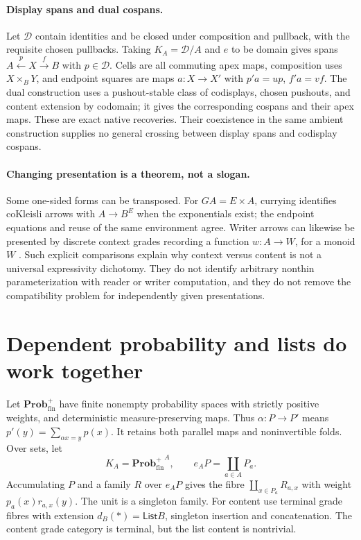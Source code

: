 \documentclass[11pt]{article}
\numberwithin{equation}{section}
\theoremstyle{definition}\newtheorem{definition}[theorem]{Definition}
\newcommand{\Prob}{\mathbf{Prob}^{+}_{\mathrm{fin}}}
\newcommand{\List}{\mathsf{List}}
\begin{document}
\paragraph{Display spans and dual cospans.}
Let $\mathcal D$ contain identities and be closed under composition and
pullback, with the requisite chosen pullbacks. Taking
$K_A=\mathcal D/A$ and $e$ to be domain gives spans
$A\xleftarrow p X\xrightarrow f B$ with $p\in\mathcal D$.
Cells are all commuting apex maps, composition uses $X\times_BY$, and
endpoint squares are maps $a:X\to X'$ with $p'a=up$, $f'a=vf$.
The dual construction uses a pushout-stable class of codisplays, chosen
pushouts, and content extension by codomain; it gives the corresponding
cospans and their apex maps. These are exact native recoveries. Their
coexistence in the same ambient construction supplies no general crossing
between display spans and codisplay cospans.

\paragraph{Changing presentation is a theorem, not a slogan.}
Some one-sided forms can be transposed. For $GA=E\times A$, currying
identifies coKleisli arrows with $A\to B^E$ when the exponentials exist;
the endpoint equations and reuse of the same environment agree. Writer
arrows can likewise be presented by discrete context grades recording a
function $w:A\to W$, for a monoid $W$ \cite[Sec.~8]{U}. Such explicit
comparisons explain why context versus content is not a universal
expressivity dichotomy. They do not identify arbitrary nonthin
parameterization with reader or writer computation, and they do not remove
the compatibility problem for independently given presentations.

\section{Dependent probability and lists do work together}\label{sec:prob}
Let $\Prob$ have finite nonempty probability spaces with strictly positive
weights, and deterministic measure-preserving maps. Thus $\alpha:P\to P'$
means $p'(y)=\sum_{\alpha x=y}p(x)$. It retains both parallel maps and
noninvertible folds. Over sets, let
\[
 K_A={\Prob}^A,\qquad e_AP=\coprod_{a\in A}P_a.
\]
Accumulating $P$ and a family $R$ over $e_AP$ gives the fibre
$\coprod_{x\in P_a}R_{a,x}$ with weight $p_a(x)r_{a,x}(y)$.
The unit is a singleton family. For content use terminal grade fibres with
extension $d_B(*)=\List B$, singleton insertion and concatenation.
The content grade category is terminal, but the list content is nontrivial.
\end{document}
